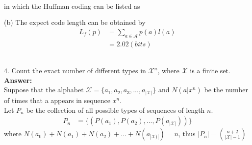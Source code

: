 \documentclass[12pt]{article}
\begin{document}
	\\in which the Huffman coding can be listed as
	\begin{table}[H]
		\centering
	\end{table}
	
	(b) The expect code length can be obtained by 
	\begin{align*}
		L_f(p) &= \sum_{a\in\mathcal{A}}p(a)l(a) \\
			   &= 2.02 (bits)
	\end{align*}
	\\
	\par 
	
	4. Count the exact number of different types in $\mathcal{X}^n$, where $\mathcal{X}$ is a finite set. \\
	\textbf{Answer:} \\
	Suppose that the alphabet $\mathcal{X} = \{a_1, a_2, a_3,...,a_{|\mathcal{X}|}\}$ and $N(a|x^n)$ be the number of times that a appears in sequence $x^n$. \\
	Let $P_n$ be the collection of all possible types of sequences of length $n$.
	\begin{align*}
		P_n &= \{ (P(a_1), P(a_2),...,P(a_{|\mathcal{X}|}))\}
	\end{align*}
	where $N(a_0) + N(a_1) + N(a_2) + ... + N(a_{|\mathcal{X})|}) = n$, thus $|P_n| = \binom{n+2}{|\mathcal{X}|-1}$
	\\
	\par 
	
\end{document}
